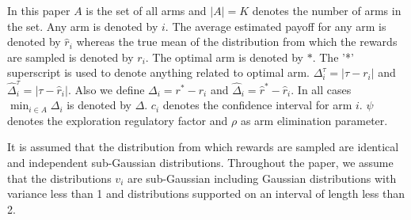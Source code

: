 In this paper $A$ is the set of all arms and $|A|=K$ denotes the number of arms in the set. Any arm is denoted by $i$. The average estimated payoff for any arm is denoted by $\hat{r}_{i}$ whereas the true mean of the distribution from which the rewards are sampled is denoted by $r_{i}$. The optimal arm is denoted by $*$. The '*' superscript is used to denote anything related to optimal arm.  $\Delta_{i}^{\tau}=|\tau-r_{i}|$ and $\hat{\Delta}_{i}^{\tau}=|\tau-\hat{r}_{i}|$. Also we define $\Delta_{i}=r^{*} - r_{i}$ and $\hat{\Delta}_{i}=\hat{r}^{*} - \hat{r}_{i}$. In all cases $\min_{i\in A}{\Delta_{i}}$ is denoted by $\Delta$. $c_{i}$ denotes the confidence interval for arm ${i}$. $\psi $ denotes the exploration regulatory factor and $\rho$ as arm elimination parameter. 
	
	It is assumed that the distribution from which rewards are sampled are identical and independent sub-Gaussian distributions. Throughout the paper, we assume that the distributions $v_{i}$ are sub-Gaussian including Gaussian distributions with variance less than 1 and distributions supported on an interval of length less than 2.

